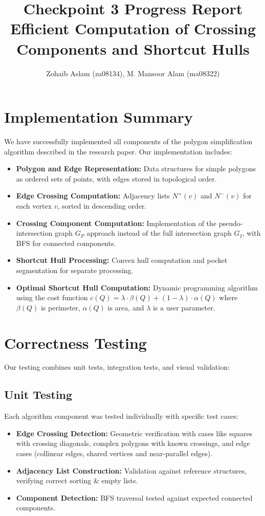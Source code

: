 \documentclass[11pt]{article}
\title{Checkpoint 3 Progress Report\\
\large Efficient Computation of Crossing Components and Shortcut Hulls}
\author{Zohaib Aslam (za08134), M. Mansoor Alam (ma08322)}
\date{}
\begin{document}
\maketitle

\section{Implementation Summary}
We have successfully implemented all components of the polygon simplification algorithm described in the research paper. Our implementation includes:
\begin{itemize}[leftmargin=*, noitemsep]
  \item \textbf{Polygon and Edge Representation:} Data structures for simple polygons as ordered sets of points, with edges stored in topological order.
  \item \textbf{Edge Crossing Computation:} Adjacency lists $N^+(v)$ and $N^-(v)$ for each vertex $v$, sorted in descending order.
  \item \textbf{Crossing Component Computation:} Implementation of the pseudo-intersection graph $G_P$ approach instead of the full intersection graph $G_I$, with BFS for connected components.
  \item \textbf{Shortcut Hull Processing:} Convex hull computation and pocket segmentation for separate processing.
  \item \textbf{Optimal Shortcut Hull Computation:} Dynamic programming algorithm using the cost function $c(Q) = \lambda \cdot \beta(Q) + (1 - \lambda) \cdot \alpha(Q)$ where $\beta(Q)$ is perimeter, $\alpha(Q)$ is area, and $\lambda$ is a user parameter.
\end{itemize}

\section{Correctness Testing}
Our testing combines unit tests, integration tests, and visual validation:

\subsection{Unit Testing}
Each algorithm component was tested individually with specific test cases:
\begin{itemize}[leftmargin=*, noitemsep]
  \item \textbf{Edge Crossing Detection:} Geometric verification with cases like squares with crossing diagonals, complex polygons with known crossings, and edge cases (collinear edges, shared vertices and near-parallel edges).
  \item \textbf{Adjacency List Construction:} Validation against reference structures, verifying correct sorting \& empty lists.
  \item \textbf{Component Detection:} BFS traversal tested against expected connected components.
\end{itemize}
\end{document}
